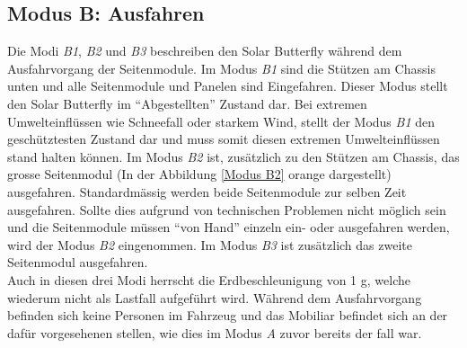 \subsection{Modus B: Ausfahren}
Die Modi \emph{B1}, \emph{B2} und \emph{B3} beschreiben den Solar Butterfly während dem Ausfahrvorgang der Seitenmodule. Im Modus \emph{B1} sind die Stützen am Chassis unten und alle Seitenmodule und Panelen sind Eingefahren. Dieser Modus stellt den Solar Butterfly im ``Abgestellten'' Zustand dar. Bei extremen Umwelteinflüssen wie Schneefall oder starkem Wind, stellt der Modus \emph{B1} den geschütztesten Zustand dar und muss somit diesen extremen Umwelteinflüssen stand halten können.
Im Modus \emph{B2} ist, zusätzlich zu den Stützen am Chassis, das grosse Seitenmodul (In der Abbildung \ref{Modus B2} orange dargestellt) ausgefahren. Standardmässig werden beide Seitenmodule zur selben Zeit ausgefahren. Sollte dies aufgrund von technischen Problemen nicht möglich sein und die Seitenmodule müssen ``von Hand'' einzeln ein- oder ausgefahren werden, wird der Modus \emph{B2} eingenommen. Im Modus \emph{B3} ist zusätzlich das zweite Seitenmodul ausgefahren.\\
Auch in diesen drei Modi herrscht die Erdbeschleunigung von 1 g, welche wiederum nicht als Lastfall aufgeführt wird. Während dem Ausfahrvorgang befinden sich keine Personen im Fahrzeug und das Mobiliar befindet sich an der dafür vorgesehenen stellen, wie dies im Modus \emph{A} zuvor bereits der fall war.


